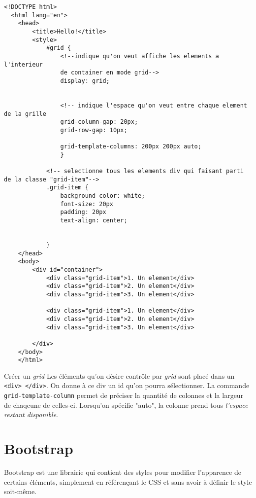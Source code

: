 \documentclass{report}
\begin{document}
\begin{ExampleDdHTML*}{}{}
  \begin{lstlisting}[style=HTMLDraculaDark] 
  <!DOCTYPE html>
  <html lang="en">
	<head>
		<title>Hello!</title>
		<style>
			#grid {
			    <!--indique qu'on veut affiche les elements a l'interieur 
				de container en mode grid-->	
				display: grid;


				<!-- indique l'espace qu'on veut entre chaque element de la grille 
				grid-column-gap: 20px;
				grid-row-gap: 10px;

				grid-template-columns: 200px 200px auto;
				}
			
			<!-- selectionne tous les elements div qui faisant parti de la classe "grid-item"-->
			.grid-item {
				background-color: white;
				font-size: 20px
				padding: 20px
				text-align: center;


			}
	</head>
	<body>
		<div id="container">
			<div class="grid-item">1. Un element</div>
			<div class="grid-item">2. Un element</div>
			<div class="grid-item">3. Un element</div>

			<div class="grid-item">1. Un element</div>
			<div class="grid-item">2. Un element</div>
			<div class="grid-item">3. Un element</div>	
			
		</div>
	</body>
	</html>
  \end{lstlisting}
\end{ExampleDdHTML*}

\begin{Remarque}{Créer un \textit{grid}}{}
Les éléments qu'on désire contrôle par \textit{grid} sont placé dans un \texttt{\footnotesize{<div> </div>}}. 
On donne à ce div un id qu'on pourra sélectionner. La commande \texttt{\footnotesize{grid-template-column}} 
permet de préciser la quantité de colonnes et la largeur de chaqcune de celles-ci. Lorsqu'on spécifie "auto",
la colonne prend tous \textit{l'espace restant disponible}. 

\end{Remarque}





\section{Bootstrap}
\begin{note}
Bootstrap est une librairie qui contient des styles pour modifier l'apparence de certains éléments, 
simplement en référençant le CSS et sans avoir à définir le style soit-même. 

\end{note}
\end{document}
